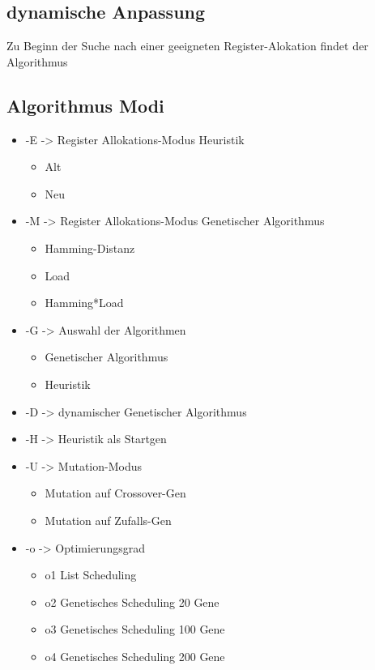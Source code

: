 \subsection{dynamische Anpassung}
Zu Beginn der Suche nach einer geeigneten Register-Alokation findet der Algorithmus
\newpage
\subsection{Algorithmus Modi}
\begin{itemize}
	 \setlength{\itemsep}{-6pt}
	\item-E -> Register Allokations-Modus Heuristik
			\begin{itemize}
				\setlength{\itemsep}{-4pt}
				\item Alt
				\item Neu
			\end{itemize}
	\item-M -> Register Allokations-Modus Genetischer Algorithmus
		\begin{itemize}
			\setlength{\itemsep}{-4pt}
			\item Hamming-Distanz
			\item Load
			\item Hamming*Load
		\end{itemize}
	\item-G -> Auswahl der Algorithmen
			\begin{itemize}
				\setlength{\itemsep}{-4pt}
				\item Genetischer Algorithmus
				\item Heuristik
			\end{itemize}
	\item-D -> dynamischer Genetischer Algorithmus
	\item-H -> Heuristik als Startgen
	\item-U -> Mutation-Modus
				\begin{itemize}
					\setlength{\itemsep}{-4pt}
					\item Mutation auf Crossover-Gen
					\item Mutation auf Zufalls-Gen
				\end{itemize}
	\item-o -> Optimierungsgrad
			\begin{itemize}
				\setlength{\itemsep}{-4pt}
				\item o1 List Scheduling
				\item o2 Genetisches Scheduling 20 Gene
				\item o3 Genetisches Scheduling 100 Gene
				\item o4 Genetisches Scheduling 200 Gene
			\end{itemize}
	
\end{itemize}


